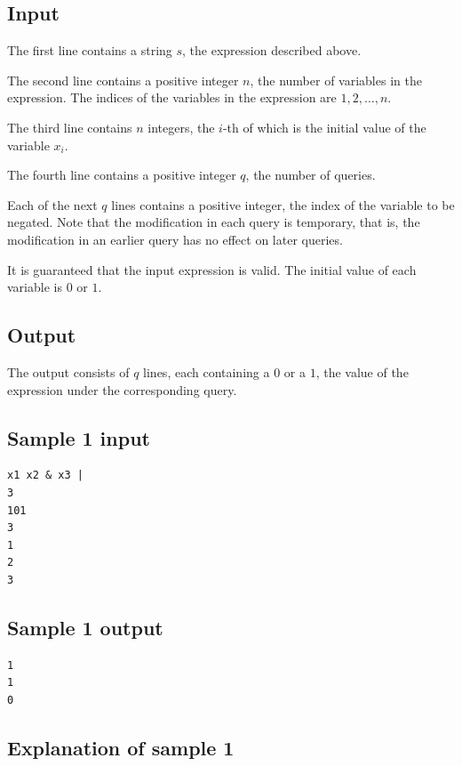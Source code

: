 \documentclass[11pt]{article}
\begin{document}
\subsection*{Input}

The first line contains a string $s$, the expression described above.

The second line contains a positive integer $n$, the number of variables in
the expression.
The indices of the variables in the expression are $1, 2, \ldots, n$.

The third line contains $n$ integers, the $i$-th of which is the initial
value of the variable $x_i$.

The fourth line contains a positive integer $q$, the number of queries.

Each of the next $q$ lines contains a positive integer, the index of the
variable to be negated.
Note that the modification in each query is temporary, that is, the
modification in an earlier query has no effect on later queries.

It is guaranteed that the input expression is valid.
The initial value of each variable is $0$ or $1$.

\subsection*{Output}

The output consists of $q$ lines, each containing a $0$ or a $1$, the value
of the expression under the corresponding query.

\subsection*{Sample 1 input}

\begin{verbatim}
x1 x2 & x3 |
3
101
3
1
2
3
\end{verbatim}

\subsection*{Sample 1 output}

\begin{verbatim}
1
1
0
\end{verbatim}

\subsection*{Explanation of sample 1}
\end{document}
